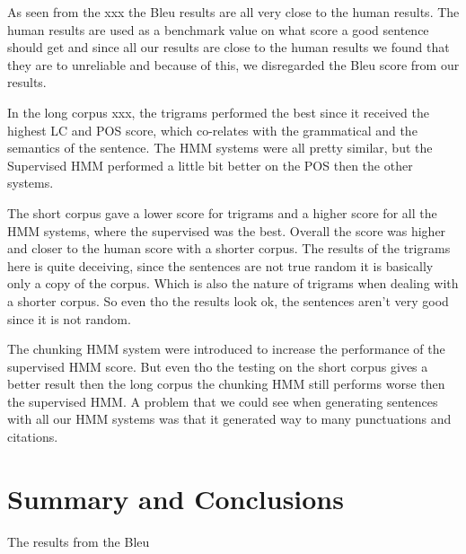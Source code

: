 \documentclass[a4paper,12pt]{article}
\begin{document}
As seen from the xxx the Bleu results are all very close to the human results. The human results are used as a
benchmark value on what score a good sentence should get and since all our results are close to the human results
we found that they are to unreliable  and because of this, we disregarded the Bleu score from our results.

In the long corpus xxx, the trigrams performed the best since it received the highest LC and POS score, which co-relates with the grammatical and the semantics of the sentence. The HMM systems were all pretty similar, but the Supervised HMM performed
a little bit better on the POS then the other systems.


The short corpus gave a lower score for trigrams and a higher score for all the HMM systems, where the supervised was the best.
Overall the score was higher and closer to the human score with a shorter corpus.
The results of the trigrams here is quite deceiving, since the sentences are not true random it is basically only a copy of the 
corpus. Which is also the nature of trigrams when dealing with a shorter corpus. So even tho the results look ok, the sentences
aren't very good since it is not random.

The chunking HMM system were introduced to increase the performance of the supervised HMM score. But even tho the
testing on the short corpus gives a better result then the long corpus the chunking HMM still performs worse then the 
supervised HMM.
A problem that we could see when generating sentences with all our HMM systems was that it generated way to many punctuations and citations.

\section{Summary and Conclusions}
\label{sec:summary}
The results from the Bleu




\end{document}
